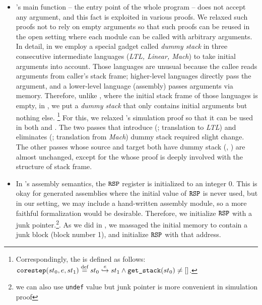 \begin{itemize}
\item
  \cc{}'s main function -- the entry point of the whole program -- does not accept any argument, and this fact is exploited in various proofs.
  We relaxed such proofs not to rely on empty arguments so that such proofs can be reused in the open setting where each module can be called with arbitrary arguments. 
  \\
  In detail, in \ccm{} we employ a special gadget called \emph{dummy stack} in three consecutive intermediate languages (\emph{LTL, Linear, Mach}) to take initial arguments into account.
  Those languages are unusual because the callee reads arguments from caller's stack frame; higher-level languages directly pass the argument, and a lower-level language (assembly) passes arguments via memory.
  Therefore, unlike \cc{}, where the initial stack frame of those languages is empty, in \ccm{}, we put a \emph{dummy stack} that only contains initial arguments but nothing else.
  \footnote{Correspondingly, the  is defined as follows: $\texttt{corestep}(st_0, e, st_1) \stackrel{\text{def}}{=} st_0 \stackrel{e}{\hookrightarrow} st_1 \land \texttt{get\_stack}(st_0) \neq []$.}
  For this, we relaxed \cc{}'s simulation proof so that it can be used in both \cc{} and \ccm{}.
  The two passes that introduce (; translation to \emph{LTL}) and eliminates (; translation from \emph{Mach}) dummy stack required slight change.
  The other passes whose source and target both have dummy stack (\eg {}, ) are almost unchanged,
  except for the  whose proof is deeply involved with the structure of stack frame.

\item
  In \cc{}'s assembly semantics, the $\texttt{RSP}$ register is initialized to an integer 0.
  This is okay for \cc{} generated assemblies where the initial value of $\texttt{RSP}$ is never used, but in our setting, we may include a hand-written assembly module, so a more faithful formalization would be desirable.
  Therefore, we initialize $\texttt{RSP}$ with a junk pointer.\footnote{we can also use \texttt{undef} value but junk pointer is more convenient in simulation proof}.
  As we did in , we massaged the initial memory to contain a junk block (block number 1), and initialize $\texttt{RSP}$ with that address.

\end{itemize}
